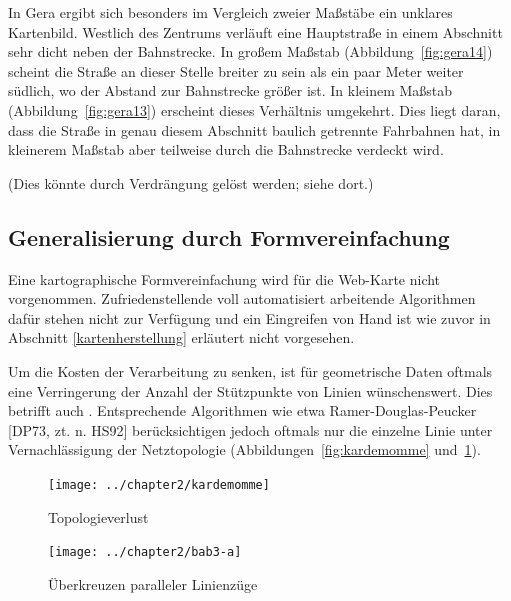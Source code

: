 \documentclass[../main/thesis.tex]{subfiles}
\begin{document}
In Gera ergibt sich besonders im Vergleich zweier Maßstäbe ein unklares Kartenbild. Westlich des Zentrums verläuft eine Hauptstraße in einem Abschnitt sehr dicht neben der Bahnstrecke. In großem Maßstab (Abbildung~\ref{fig:gera14}) scheint die Straße an dieser Stelle breiter zu sein als ein paar Meter weiter südlich, wo der Abstand zur Bahnstrecke größer ist. In kleinem Maßstab (Abbildung~\ref{fig:gera13}) erscheint dieses Verhältnis umgekehrt. Dies liegt daran, dass die Straße in genau diesem Abschnitt baulich getrennte Fahrbahnen hat, in kleinerem Maßstab aber teilweise durch die Bahnstrecke verdeckt wird.

(Dies könnte durch Verdrängung gelöst werden; siehe dort.)



\subsection{Generalisierung durch Formvereinfachung}


Eine kartographische Formvereinfachung wird für die Web-Karte nicht vorgenommen. Zufriedenstellende voll automatisiert arbeitende Algorithmen dafür stehen nicht zur Verfügung und ein Eingreifen von Hand ist wie zuvor in Abschnitt \ref{kartenherstellung} erläutert nicht vorgesehen.

Um die Kosten der Verarbeitung zu senken, ist für geometrische Daten oftmals eine Verringerung der Anzahl der Stützpunkte von Linien wünschenswert. Dies betrifft auch \osm. Entsprechende Algorithmen wie etwa Ramer-Douglas-Peucker [\noref DP73, zt. n. HS92] berücksichtigen jedoch oftmals nur die einzelne Linie unter Vernachlässigung der Netztopologie (Abbildungen~\ref{fig:kardemomme} und~\ref{fig:bab3-a}).

\begin{figure}[ht]
  \begin{minipage}{.5\linewidth}
    \centering
    \texttt{[image: ../chapter2/kardemomme]}
    \caption{Topologieverlust}\label{fig:kardemomme}
  \end{minipage}%
  \begin{minipage}{.5\linewidth}
    \centering
    \texttt{[image: ../chapter2/bab3-a]}
    \caption{Überkreuzen paralleler Linienzüge}\label{fig:bab3-a}
  \end{minipage}
\end{figure}
\end{document}
